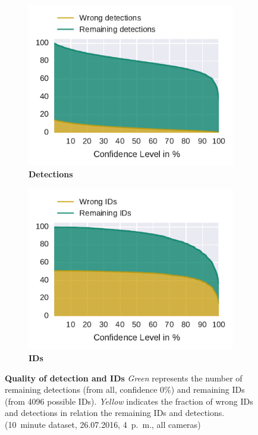 \begin{figure}
    \centering
    \begin{subfigure}[b]{0.45\textwidth}
        \includegraphics[width=\textwidth]{Figures/detectionsWrongConf}
        \caption[Detections]{ \textbf{Detections}}
        \label{fig:detections}
    \end{subfigure}
    \begin{subfigure}[b]{0.45\textwidth}
        \includegraphics[width=\textwidth]{Figures/idsWrongConf}
        \caption[IDs]{\textbf{IDs}}
        \label{fig:ids}
    \end{subfigure}
 	\caption[Quality of detection and IDs]{\textbf{Quality of detection and IDs} \emph{Green} represents the number of remaining detections (from all, confidence 0\%) and remaining IDs (from 4096 possible IDs). \emph{Yellow} indicates the fraction of wrong IDs and detections in relation the remaining IDs and detections. (10~minute dataset, 26.07.2016, 4~p.~m., all cameras)}
 	\label{fig:remainingVSquality}
\end{figure}

